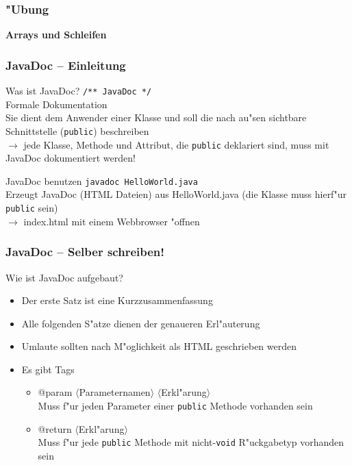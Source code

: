 \documentclass{beamer}
\begin{document}
\begin{frame}
\frametitle{"Ubung}
\begin{center}
\textbf{\Huge Arrays und Schleifen}
\end{center}
\end{frame}


\begin{frame}
\frametitle{JavaDoc -- Einleitung} 
\begin{block}{Was ist JavaDoc?}
\lstinline|/** JavaDoc */|\pause\\
Formale Dokumentation\pause\\
Sie dient dem Anwender einer Klasse und soll die nach au"sen sichtbare Schnittstelle (\texttt{public}) beschreiben\pause\\
$\rightarrow$ jede Klasse, Methode und Attribut, die \texttt{public} deklariert sind, muss mit JavaDoc dokumentiert werden!
\end{block}

\pause

\begin{block}{JavaDoc benutzen}
\texttt{javadoc HelloWorld.java}\\
Erzeugt JavaDoc (HTML Dateien) aus HelloWorld.java (die Klasse muss hierf"ur \texttt{public} sein)\\
$\rightarrow$ index.html mit einem Webbrowser "offnen
\end{block}
\end{frame}


\begin{frame}
\frametitle{JavaDoc -- Selber schreiben!}
\begin{block}{Wie ist JavaDoc aufgebaut?}
\begin{itemize}
\item Der erste Satz ist eine Kurzzusammenfassung
\item Alle folgenden S"atze dienen der genaueren Erl"auterung
\item Umlaute sollten nach M"oglichkeit als HTML geschrieben werden
\item Es gibt Tags
\begin{itemize}
\item @param $\langle$Parameternamen$\rangle$ $\langle$Erkl"arung$\rangle$\\
\alert{Muss} f"ur jeden Parameter einer \texttt{public} Methode vorhanden sein
\item @return $\langle$Erkl"arung$\rangle$\\
\alert{Muss} f"ur jede \texttt{public} Methode mit nicht-\texttt{void} R"uckgabetyp vorhanden sein
\end{itemize}
\end{itemize}
\end{block}
\end{frame}
\end{document}
